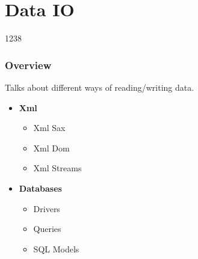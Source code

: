 %
%
%
%

\section{Data IO}

\begin{slide}{1238}\label{xml-processing}
\frametitle{Overview}

Talks about different ways of reading/writing data.

\begin{itemize}
\item \textbf{Xml}
  \begin{itemize}
  \item Xml Sax
  \item Xml Dom
  \item Xml Streams
  \end{itemize}
\item \textbf{Databases}
  \begin{itemize}
  \item Drivers
  \item Queries
  \item SQL Models
  \end{itemize}
\end{itemize}
\end{slide}




